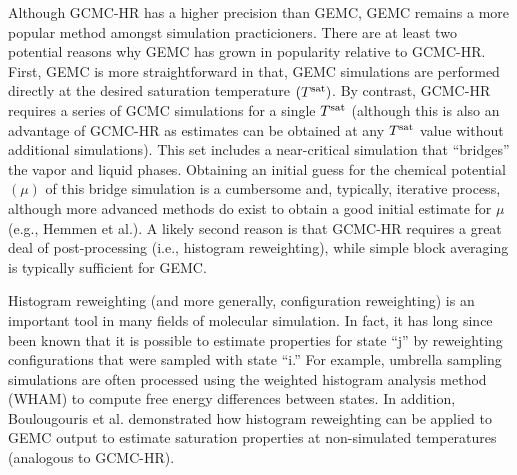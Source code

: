 \documentclass[journal=jced,manuscript=article]{achemso}
\begin{document}

Although GCMC-HR has a higher precision than GEMC, GEMC remains a more popular method amongst simulation practicioners. There are at least two potential reasons why GEMC has grown in popularity relative to GCMC-HR. First, GEMC is more straightforward in that, GEMC simulations are performed directly at the desired saturation temperature $(T^{\rm sat})$. By contrast, GCMC-HR requires a series of GCMC simulations for a single $T^{\rm sat}$ (although this is also an advantage of GCMC-HR as estimates can be obtained at any $T^{\rm sat}$ value without additional simulations). This set includes a near-critical simulation that ``bridges'' the vapor and liquid phases. Obtaining an initial guess for the chemical potential $(\mu)$ of this bridge simulation is a cumbersome and, typically, iterative process, although more advanced methods do exist to obtain a good initial estimate for $\mu$ (e.g., Hemmen et al.). A likely second reason is that GCMC-HR requires a great deal of post-processing (i.e., histogram reweighting), while simple block averaging is typically sufficient for GEMC. 

Histogram reweighting (and more generally, configuration reweighting) is an important tool in many fields of molecular simulation. In fact, it has long since been known that it is possible to estimate properties for state ``j'' by reweighting configurations that were sampled with state ``i.'' For example, umbrella sampling simulations are often processed using the weighted histogram analysis method (WHAM) to compute free energy differences between states. In addition, Boulougouris et al. demonstrated how histogram reweighting can be applied to GEMC output to estimate saturation properties at non-simulated temperatures (analogous to GCMC-HR).


\end{document}

